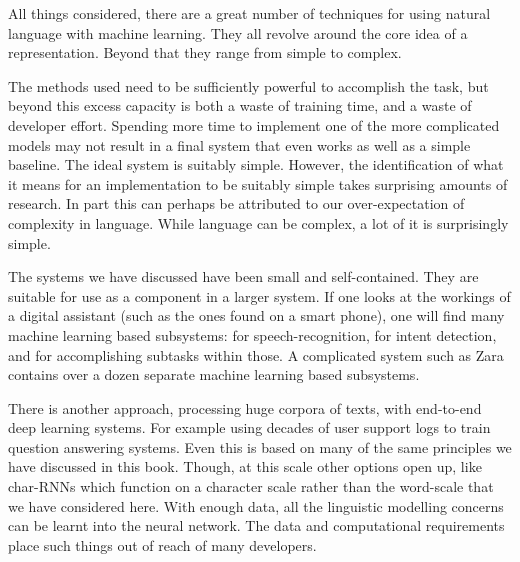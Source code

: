 \documentclass[12pt,parskip]{komatufte}
\begin{document}
All things considered, there are a great number of techniques for using natural language with machine learning.
They all revolve around the core idea of a representation.
Beyond that they range from simple to complex.




The methods used need to be sufficiently powerful to accomplish the task,
but beyond this excess capacity is both a waste of training time,
and a waste of developer effort.
Spending more time to implement one of the more complicated models may not result in a final system that even works as well as a simple baseline.
The ideal system is suitably simple.
However, the identification of what it means for an implementation to be suitably simple takes surprising amounts of research.
In part this can perhaps be attributed to our over-expectation of complexity in language.
While language can be complex, a lot of it is surprisingly simple.


The systems we have discussed have been small and self-contained.
They are suitable for use as a component in a larger system.
If one looks at the workings of a digital assistant (such as the ones found on a smart phone),
one will find many machine learning based subsystems:
for speech-recognition, for intent detection, and for accomplishing subtasks within those.
A complicated system such as Zara  contains over a dozen separate machine learning based subsystems.


There is another approach, processing huge corpora of texts, with end-to-end deep learning systems.
For example using decades of user support logs to train question answering systems.
Even this is based on many of the same principles we have discussed in this book.
Though, at this scale other options open up, like char-RNNs which function on a character scale rather than the word-scale that we have considered here.
With enough data, all the linguistic modelling concerns can be learnt into the neural network.
The data and computational requirements place such things out of reach of many developers.
\end{document}
